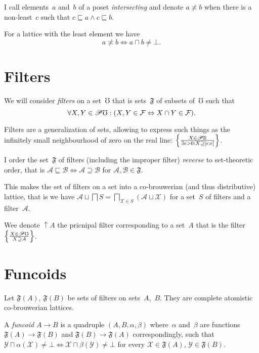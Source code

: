 \documentclass{amsart}
\begin{document}
I call elements~$a$ and~$b$ of a poset \emph{intersecting} and
denote $a\nasymp b$ when there is a non-least~$c$ such that $c\sqsubseteq a\land c\sqsubseteq b$.

For a lattice with the least element we have
\[ a\nasymp b \Leftrightarrow a\sqcap b\ne\bot. \]

\section{Filters}

We will consider \emph{filters} on a set~$\mho$ that is sets~$\mathfrak{F}$ of subsets of~$\mho$ such that
\[ \forall X,Y\in\mathscr{P}\mho:
(X,Y\in\mathcal{F} \Leftrightarrow X\cap Y\in\mathcal{F}). \]

Filters are a generalization of sets, allowing to express such things as the infinitely small neighbourhood of zero on the real line: $\left\{ \frac{X\in\mathscr{P}\mathbb{R}}{\exists\epsilon>0:X\supseteq\left]\epsilon;\epsilon\right[}\right\}$.

\begin{defn}
I order the set~$\mathfrak{F}$ of filters (including the improper filter) \emph{reverse} to set-theoretic order, that is
$\mathcal{A} \sqsubseteq \mathcal{B} \Leftrightarrow \mathcal{A} \supseteq \mathcal{B}$
for $\mathcal{A},\mathcal{B}\in\mathfrak{F}$.
\end{defn}

\begin{prop}
This makes the set of filters on a set into a co-brouwerian (and thus distributive) lattice, that is we have
$\mathcal{A} \sqcup \bigsqcap S = \bigsqcap_{\mathcal{X}\in S} (\mathcal{A} \sqcup \mathcal{X})$
for a set~$S$ of filters and a filter~$\mathcal{A}$.
\end{prop}

Wee denote $\uparrow A$ the pricnipal filter corresponding to a set~$A$ that is the filter $\left\{ \frac{X\in\mathscr{P}\mho}{X\supseteq A}\right\}$.

\section{Funcoids}

Let $\mathfrak{F}(A)$, $\mathfrak{F}(B)$ be sets of filters on sets~$A$,~$B$.
They are complete atomistic co-brouwerian lattices.

\begin{defn}
A \emph{funcoid} $A\rightarrow B$ is a quadruple $(A,B,\alpha,\beta)$
where~$\alpha$ and~$\beta$ are functions $\mathfrak{F}(A)\rightarrow \mathfrak{F}(B)$
and $\mathfrak{F}(B)\rightarrow \mathfrak{F}(A)$ correspondingly, such that
$\mathcal{Y} \sqcap \alpha(\mathcal{X}) \ne \bot \Leftrightarrow \mathcal{X} \sqcap \beta(\mathcal{Y}) \ne \bot$
for every $\mathcal{X}\in\mathfrak{F}(A)$, $\mathcal{Y}\in\mathfrak{F}(B)$.
\end{defn}
\end{document}
